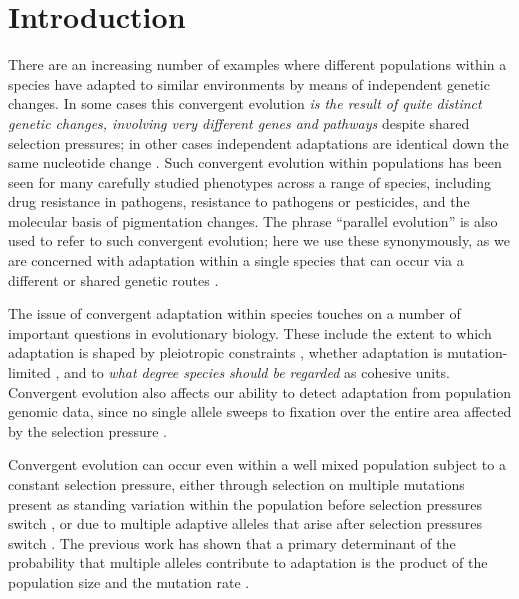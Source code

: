 \documentclass{article}
\newcommand{\mfp}[1]{{\it\color{red} #1} }
\begin{document}
\section{Introduction}

There are an increasing number of examples where
different populations within a species have
adapted to similar environments by means of independent genetic changes. 
In some cases this convergent evolution \mfp{is the result of quite
distinct genetic changes, involving very different genes and pathways} despite shared selection pressures; 
in other cases independent adaptations are identical down the same
nucleotide change
\citep{Jeong20141,stern2013genetic,MartinOrgogozo:13, Conte2012}. 
Such convergent evolution within populations has been seen for many
carefully studied phenotypes across a range of species, 
including drug resistance in pathogens,
resistance to pathogens or pesticides,
and the molecular basis of pigmentation changes.
The phrase ``parallel evolution'' is also used to refer to such convergent evolution;
here we use these synonymously, 
as we are concerned with adaptation within a single
species that can occur via a different or shared genetic routes \citep[see][for more discussion]{Arendt:08}.

The issue of convergent adaptation within species touches on a number
of important questions in evolutionary biology. 
These include the extent to which adaptation is shaped by pleiotropic constraints \citep{Haldane:book,Orr:05},
whether adaptation is mutation-limited \citep{Bradshaw:91,karasov2010}, 
and to \mfp{what degree species should be regarded} as cohesive units. 
Convergent evolution also affects our ability to detect adaptation from population genomic data,
since no single allele sweeps to fixation over the entire area affected by the selection pressure \citep{softsweepsIII}.

Convergent evolution can occur even within a well mixed population
subject to a constant selection pressure, 
either through selection on multiple mutations present as standing variation within the population
before selection pressures switch \citep{Orr:01,softsweepsI},
or due to multiple adaptive alleles that arise after selection pressures switch \citep{softsweepsII}. 
The previous work has shown that 
a primary determinant of the probability that multiple alleles contribute to adaptation
is the product of the population size and the mutation rate \citep[see][for a review]{MesserPetrov}. 
\end{document}
